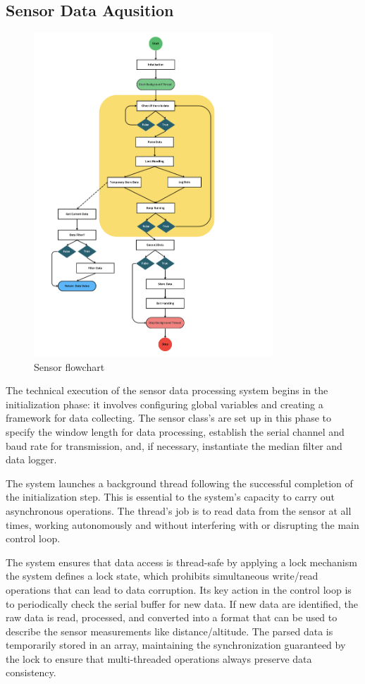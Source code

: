 \documentclass{article}
\begin{document}
\subsection{Sensor Data Aqusition}
\begin{figure}[H]
  \centering
  \includegraphics[width=0.8\textwidth]{Pictures/sensor_flowchart.png}
  \caption{Sensor flowchart}
  \label{fig:Sensor_flowchart}
\end{figure}
The technical execution of the sensor data processing system begins in the
initialization phase: it involves configuring global variables and creating a
framework for data collecting. The sensor class's are set up in this phase to
specify the window length for data processing, establish the serial channel and
baud rate for transmission, and, if necessary, instantiate the median filter and
data logger. 

The system launches a background thread following the successful completion of
the initialization step. This is essential to the system's capacity to carry out
asynchronous operations. The thread's job is to read data from the sensor at all
times, working autonomously and without interfering with or disrupting the main
control loop. 

The system ensures that data access is thread-safe by applying a lock mechanism
the system defines a lock state, which prohibits simultaneous write/read
operations that can lead to data corruption. Its key action in the control loop
is to periodically check the serial buffer for new data. If new data are
identified, the raw data is read, processed, and converted into a format that
can be used to describe the sensor measurements like distance/altitude. The
parsed data is temporarily stored in an array, maintaining the synchronization
guaranteed by the lock to ensure that multi-threaded operations always preserve
data consistency. 
\end{document}
